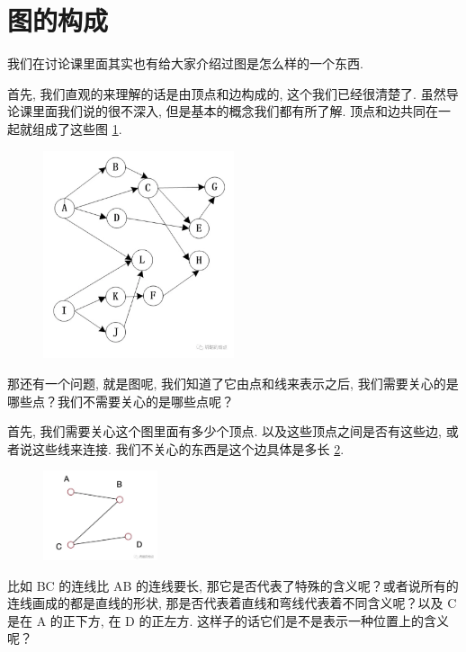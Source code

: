\section{图的构成}

我们在讨论课里面其实也有给大家介绍过图是怎么样的一个东西. 

首先, 我们直观的来理解的话是由顶点和边构成的, 这个我们已经很清楚了. 虽然导论课里面我们说的很不深入, 但是基本的概念我们都有所了解. 顶点和边共同在一起就组成了这些图 \ref{fig:img24_6}. 

\begin{figure}[ht]
  \centering
  \includegraphics[width=0.5\textwidth]{asset/20231227144901.png}
  \caption{}
  \label{fig:img24_6}
\end{figure}

那还有一个问题, 就是图呢, 我们知道了它由点和线来表示之后, 我们需要关心的是哪些点？我们不需要关心的是哪些点呢？

首先, 我们需要关心这个图里面有多少个顶点. 以及这些顶点之间是否有这些边, 或者说这些线来连接. 我们不关心的东西是这个边具体是多长 \ref{fig:img24_7}. 

\begin{figure}[ht]
  \centering
  \includegraphics[width=0.3\textwidth]{asset/20231227144917.png}
  \caption{}
  \label{fig:img24_7}
\end{figure}

比如 BC 的连线比 AB 的连线要长, 那它是否代表了特殊的含义呢？或者说所有的连线画成的都是直线的形状, 那是否代表着直线和弯线代表着不同含义呢？以及 C 是在 A 的正下方, 在 D 的正左方. 这样子的话它们是不是表示一种位置上的含义呢？

